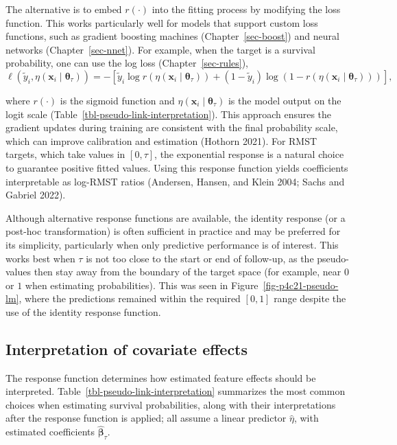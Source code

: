 \documentclass[
  letterpaper,
  krantz2]{style/krantz}
\begin{document}
The alternative is to embed \(r(\cdot)\) into the fitting process by
modifying the loss function. This works particularly well for models
that support custom loss functions, such as gradient boosting machines
(Chapter~\ref{sec-boost}) and neural networks (Chapter~\ref{sec-nnet}).
For example, when the target is a survival probability, one can use the
log loss (Chapter~\ref{sec-rules}), \[
\ell(\tilde{y}_i, \eta(\mathbf{x}_i\mid\boldsymbol{\theta}_\tau)) = -\left[\tilde{y}_i \log r(\eta(\mathbf{x}_i\mid\boldsymbol{\theta}_\tau)) + (1 - \tilde{y}_i) \log(1 - r(\eta(\mathbf{x}_i\mid\boldsymbol{\theta}_\tau)))\right],
\]

where \(r(\cdot)\) is the sigmoid function and
\(\eta(\mathbf{x}_i\mid\boldsymbol{\theta}_\tau)\) is the model output
on the logit scale (Table~\ref{tbl-pseudo-link-interpretation}). This
approach ensures the gradient updates during training are consistent
with the final probability scale, which can improve calibration and
estimation (Hothorn 2021). For RMST targets, which take values in
\([0, \tau]\), the exponential response is a natural choice to guarantee
positive fitted values. Using this response function yields coefficients
interpretable as log-RMST ratios (Andersen, Hansen, and Klein 2004;
Sachs and Gabriel 2022).

Although alternative response functions are available, the identity
response (or a post-hoc transformation) is often sufficient in practice
and may be preferred for its simplicity, particularly when only
predictive performance is of interest. This works best when \(\tau\) is
not too close to the start or end of follow-up, as the pseudo-values
then stay away from the boundary of the target space (for example, near
\(0\) or \(1\) when estimating probabilities). This was seen in
Figure~\ref{fig-p4c21-pseudo-lm}, where the predictions remained within
the required \([0,1]\) range despite the use of the identity response
function.

\subsection{Interpretation of covariate
effects}\label{interpretation-of-covariate-effects}

The response function determines how estimated feature effects should be
interpreted. Table~\ref{tbl-pseudo-link-interpretation} summarizes the
most common choices when estimating survival probabilities, along with
their interpretations after the response function is applied; all assume
a linear predictor \(\hat\eta\), with estimated coefficients
\(\hat{\boldsymbol{\beta}}_\tau\).
\end{document}
